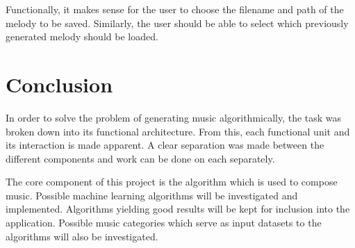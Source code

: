 Functionally, it makes sense for the user to choose the filename and path of the melody to be saved. Similarly, the user should be able to select which previously generated melody should be loaded.

\chapter{Conclusion}
In order to solve the problem of generating music algorithmically, the task was broken down into its functional architecture. From this, each functional unit and its interaction is made apparent. A clear separation was made between the different components and work can be done on each separately. 

The core component of this project is the algorithm which is used to compose music. Possible machine learning algorithms will be investigated and implemented. Algorithms yielding good results will be kept for inclusion into the application. Possible music categories which serve as input datasets to the algorithms will also be investigated.


